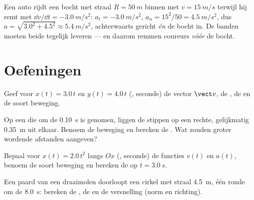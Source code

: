 \begin{example}\label{ex:g12:kinematics-2d:bend}
Een auto rijdt een bocht met straal $R = \qty{50}{m}$ binnen met
$v = \qty{15}{m/s}$ terwijl hij remt met
$\dd v/\dd t = \qty{-3.0}{m/s^2}$: $a_t = \qty{-3.0}{m/s^2}$,
$a_n = 15^2/50 = \qty{4.5}{m/s^2}$, dus
$a = \sqrt{3.0^2 + 4.5^2} \approx \qty{5.4}{m/s^2}$, achterwaarts
gericht \emph{én} de bocht in. De banden moeten beide tegelijk leveren ---
en daarom remmen coureurs \emph{vóór} de bocht.
\end{example}

\section{Oefeningen}

\begin{exercise}[$\star$]\label{exo:g12:kinematics-2d:1}
Geef voor $x(t) = 3.0\,t$ en $y(t) = 4.0\,t$ (, seconde) de vector
$\vect v$, de , de  en de soort beweging.
\end{exercise}

\begin{exercise}[$\star$]\label{exo:g12:kinematics-2d:2}
Op een  die om de \qty{0.10}{s} is genomen, liggen de
stippen op een rechte, gelijkmatig \qty{0.35}{m} uit elkaar. Benoem de
beweging en bereken de . Wat zouden groter wordende afstanden
aangeven?
\end{exercise}

\begin{exercise}[$\star$]\label{exo:g12:kinematics-2d:3}
Bepaal voor $x(t) = 2.0\,t^2$ langs $Ox$ (, seconde) de functies
$v(t)$ en $a(t)$, benoem de soort beweging en bereken de  op
$t = \qty{3.0}{s}$.
\end{exercise}

\begin{exercise}[$\star$]\label{exo:g12:kinematics-2d:4}
Een paard van een draaimolen doorloopt een cirkel met straal \qty{4.5}{m},
één ronde om de \qty{8.0}{s}: bereken de , de  en
de versnelling (norm en richting).
\end{exercise}


